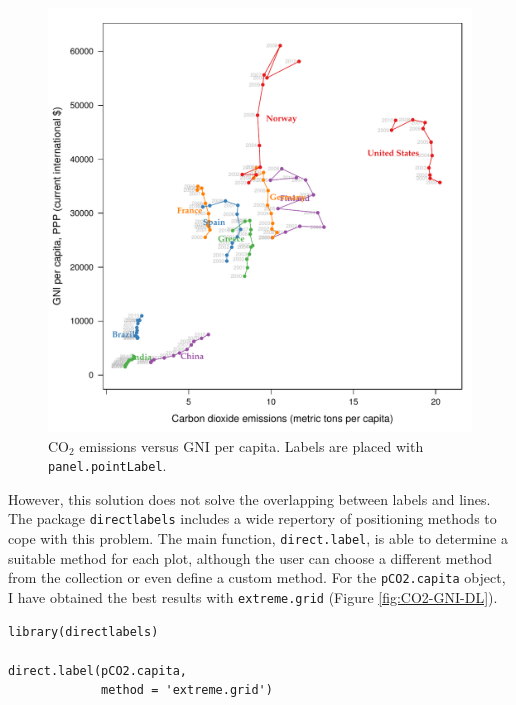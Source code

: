 \documentclass[smallroyalvopaper]{memoir}
\begin{document}
\begin{figure}[htbp]
\centering
\includegraphics[width=.9\linewidth]{figs/CO2_capita.pdf}
\caption{\(\mathrm{CO_2}\) emissions versus GNI per capita. Labels are placed with \texttt{panel.pointLabel}. \label{fig:CO2-GNI-glayer}}
\end{figure}

However, this solution does not solve the overlapping between labels
and lines. The package \texttt{directlabels} \cite{Hocking2013} includes a
wide repertory of positioning methods to cope with this problem. The
main function, \texttt{direct.label}, is able to determine a suitable method
for each plot, although the user can choose a different method from
the collection or even define a custom method. For the \texttt{pCO2.capita}
object, I have obtained the best results with \texttt{extreme.grid} (Figure
\ref{fig:CO2-GNI-DL}).


\lstset{language=r,label= ,caption= ,captionpos=b,numbers=none}
\begin{lstlisting}
library(directlabels)

direct.label(pCO2.capita,
             method = 'extreme.grid')
\end{lstlisting}
\end{document}
